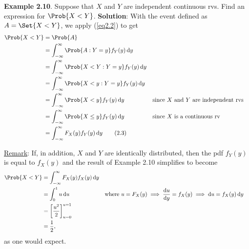 \begin{Example}
    \textbf{Example 2.10}. Suppose that $ X $ and $ Y $ are independent continuous rvs. Find an expression for
    $ \Prob{X<Y} $.
    \tcblower{}
    \textbf{Solution}: With the event defined as $ A=\Set{X<Y} $, we apply (\ref{eq2.2}) to get
    \begin{align*}
        \Prob{X<Y}
         & =\Prob{A}                                                                                                                 \\
         & =\int_{-\infty}^{\infty}\Prob{A\given Y=y}f_Y(y)\odif{y}                                                                  \\
         & =\int_{-\infty}^{\infty}\Prob{X<Y\given Y=y}f_Y(y)\odif{y}                                                                \\
         & =\int_{-\infty}^{\infty}\Prob{X<y\given Y=y}f_Y(y)\odif{y}                                                                \\
         & =\int_{-\infty}^{\infty}\Prob{X<y}f_Y(y)\odif{y}                    &  & \text{since $ X $ and $ Y $ are independent rvs} \\
         & =\int_{-\infty}^{\infty}\Prob{X\le y}f_Y(y)\odif{y}                 &  & \text{since $ X $ is a continuous rv}            \\
         & =\int_{-\infty}^{\infty}F_X(y) f_Y(y)\odif{y}\label{eq2.3}\tag{2.3}
    \end{align*}
\end{Example}
\underline{Remark}: If, in addition, $ X $ and $ Y $ are identically distributed, then the pdf $ f_Y(y) $ is equal
to $ f_X(y) $ and the result of Example 2.10 simplifies to become
\begin{align*}
    \Prob{X<Y}
     & =\int_{-\infty}^{\infty}F_X(y)f_X(y)\odif{y}                                                                                       \\
     & =\int_{0}^{1}u\odif{u}                       &  & \text{where } u=F_X(y)\implies \odv{u}{y}=f_X(y)\implies \odif{u}=f_X(y)\odif{y} \\
     & =\biggl[\frac{u^2}{2} \biggr]_{u=0}^{u=1}                                                                                          \\
     & =\frac{1}{2},
\end{align*}
as one would expect.
